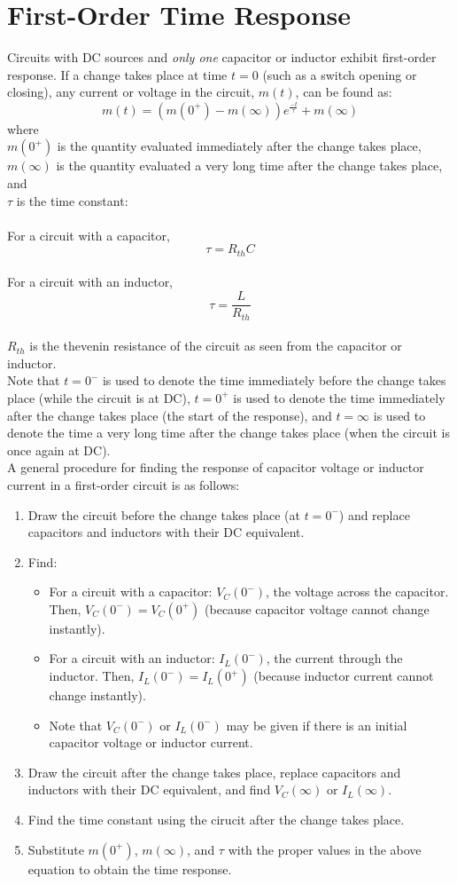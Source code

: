 \documentclass{article}
\begin{document}
\section{First-Order Time Response}
Circuits with DC sources and \textit{only one} capacitor or inductor exhibit first-order response. If a change takes place at time $t=0$ (such as a switch opening or closing), any current or voltage in the circuit, $m(t)$, can be found as:
$$m(t) = (m(0^+) - m(\infty))e^{\frac{-t}{\tau}} + m(\infty)$$
where
\\$m(0^+)$ is the quantity evaluated immediately after the change takes place,
\\$m(\infty)$ is the quantity evaluated a very long time after the change takes place, and
\\$\tau$ is the time constant:
\\
\\For a circuit with a capacitor, $$\tau = R_{th}C$$
\\For a circuit with an inductor, $$\tau = \frac{L}{R_{th}}$$
\\$R_{th}$ is the thevenin resistance of the circuit as seen from the capacitor or inductor.
\\Note that $t=0^-$ is used to denote the time immediately before the change takes place (while the circuit is at DC), $t=0^+$ is used to denote the time immediately after the change takes place (the start of the response), and $t=\infty$ is used to denote the time a very long time after the change takes place (when the circuit is once again at DC).
\\A general procedure for finding the response of capacitor voltage or inductor current in a first-order circuit is as follows:
\begin{enumerate}
\item Draw the circuit before the change takes place (at $t=0^-$) and replace capacitors and inductors with their DC equivalent.
\item Find:
\begin{itemize}
\item For a circuit with a capacitor: $V_C(0^-)$, the voltage across the capacitor. Then, $V_C(0^-) = V_C(0^+)$ (because capacitor voltage cannot change instantly).
\item For a circuit with an inductor: $I_L(0^-)$, the current through the inductor. Then, $I_L(0^-) = I_L(0^+)$ (because inductor current cannot change instantly).
\item Note that $V_C(0^-)$ or $I_L(0^-)$ may be given if there is an initial capacitor voltage or inductor current.
\end{itemize}
\item Draw the circuit after the change takes place, replace capacitors and inductors with their DC equivalent, and find $V_C(\infty)$ or $I_L(\infty)$.
\item Find the time constant using the cirucit after the change takes place.
\item Substitute $m(0^+)$, $m(\infty)$, and $\tau$ with the proper values in the above equation to obtain the time response.
\end{enumerate}
\end{document}
